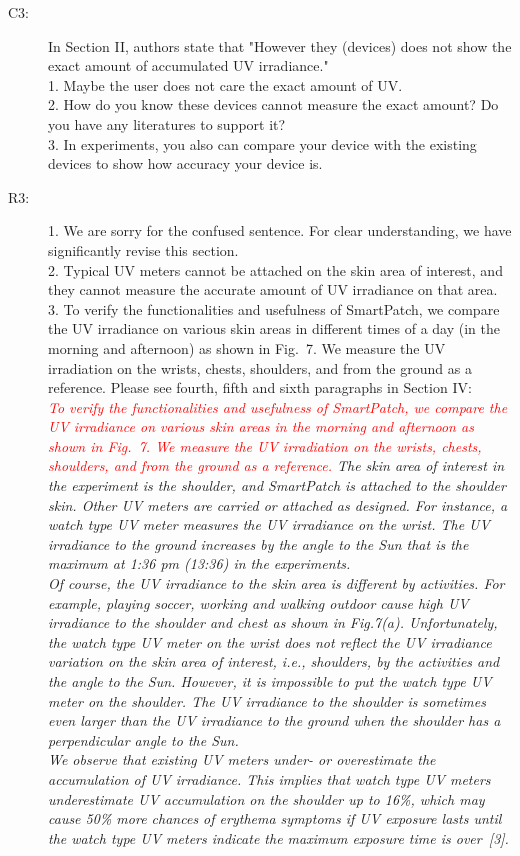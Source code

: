 \documentclass[onecolumn]{IEEEconf}
\begin{document}
\begin{description}
\item [C3: ] In Section II, authors state that "However they (devices) does not show the exact amount of accumulated UV irradiance." \\
1. Maybe the user does not care the exact amount of UV. \\
2. How do you know these devices cannot measure the exact amount? Do you have any literatures to support it?\\
3. In experiments, you also can compare your device with the existing devices to show how accuracy your device is.
\item [R3: ] 
1. We are sorry for the confused sentence. For clear understanding, we have significantly revise this section.\\
2. Typical UV meters cannot be attached on the skin area of interest, and they cannot measure the accurate amount of UV irradiance on that area.\\
3. To verify the functionalities and usefulness of SmartPatch, we compare the UV irradiance on various skin areas in different times of a day (in the morning and afternoon) as shown in Fig.~7. We measure the UV irradiation on the wrists, chests, shoulders, and from the ground as a reference. Please see fourth, fifth and sixth paragraphs in Section IV:\\

\textit{\textcolor{red}{To verify the functionalities and usefulness of SmartPatch, we compare the UV irradiance on various skin areas in the morning and afternoon as shown in Fig.~7. We measure the UV irradiation on the wrists, chests, shoulders, and from the ground as a reference.}
The skin area of interest in the experiment is the shoulder, and SmartPatch is attached to the shoulder skin. Other UV meters are carried or attached as designed. For instance, a watch type UV meter measures the UV irradiance on the wrist. The UV irradiance to the ground increases by the angle to the Sun that is the maximum at 1:36 pm (13:36) in the experiments.\\
%
Of course, the UV irradiance to the skin area is different by activities.
For example, playing soccer, working and walking outdoor cause high UV irradiance to the shoulder and chest as shown in Fig.7(a).
Unfortunately, the watch type UV meter on the wrist does not reflect the UV irradiance variation on the skin area of interest, i.e., shoulders, by the activities and the angle to the Sun.
However, it is impossible to put the watch type UV meter on the shoulder.
The UV irradiance to the shoulder is sometimes even larger than the UV irradiance to the ground when the shoulder has a perpendicular angle to the Sun.\\
%
We observe that existing UV meters under- or overestimate the accumulation of UV irradiance.
This implies that watch type UV meters underestimate UV accumulation on the shoulder up to 16\%, which may cause 50\% more chances of erythema symptoms if UV exposure lasts until the watch type UV meters indicate the maximum exposure time is over~[3].}\\
~\\


\end{description}
\end{document}
